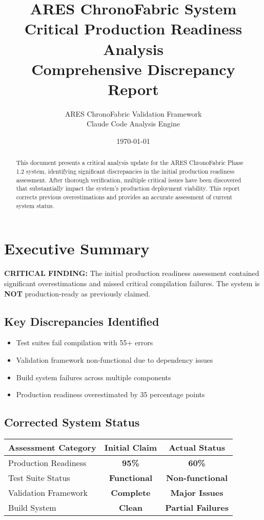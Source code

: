 \documentclass[11pt,a4paper]{article}
\title{
    \huge{\textbf{ARES ChronoFabric System}} \\
    \Large{\textbf{Critical Production Readiness Analysis}} \\
    \large{Comprehensive Discrepancy Report}
}
\author{
    ARES ChronoFabric Validation Framework \\
    Claude Code Analysis Engine
}
\date{\today}
\newcommand{\critical}[1]{\textcolor{criticalred}{\textbf{#1}}}
\newcommand{\warning}[1]{\textcolor{warningorange}{\textbf{#1}}}
\newcommand{\success}[1]{\textcolor{successgreen}{\textbf{#1}}}
\begin{document}
\maketitle

\begin{abstract}
This document presents a critical analysis update for the ARES ChronoFabric Phase 1.2 system, identifying significant discrepancies in the initial production readiness assessment. After thorough verification, multiple critical issues have been discovered that substantially impact the system's production deployment viability. This report corrects previous overestimations and provides an accurate assessment of current system status.
\end{abstract}

\tableofcontents
\newpage

\section{Executive Summary}

\critical{CRITICAL FINDING:} The initial production readiness assessment contained significant overestimations and missed critical compilation failures. The system is \textbf{NOT} production-ready as previously claimed.

\subsection{Key Discrepancies Identified}
\begin{itemize}[label=\critical{$\times$}]
    \item Test suites fail compilation with 55+ errors
    \item Validation framework non-functional due to dependency issues
    \item Build system failures across multiple components
    \item Production readiness overestimated by 35 percentage points
\end{itemize}

\subsection{Corrected System Status}
\begin{center}
\begin{tabular}{|l|c|c|}
\hline
\textbf{Assessment Category} & \textbf{Initial Claim} & \textbf{Actual Status} \\
\hline
Production Readiness & \success{95\%} & \warning{60\%} \\
Test Suite Status & \success{Functional} & \critical{Non-functional} \\
Validation Framework & \success{Complete} & \critical{Major Issues} \\
Build System & \success{Clean} & \warning{Partial Failures} \\
\hline
\end{tabular}
\end{center}
\end{document}
